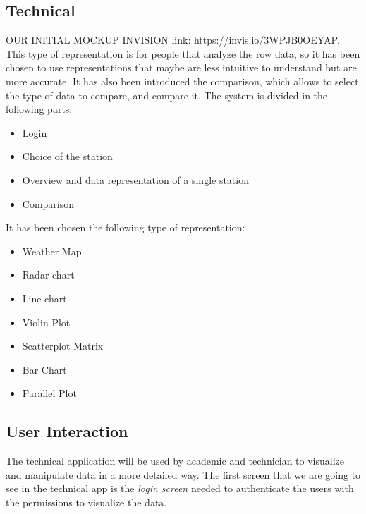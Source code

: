 \documentclass[12pt]{article} %
\begin{document}
\subsection{Technical}
OUR INITIAL MOCKUP INVISION link: https://invis.io/3WPJB0OEYAP.
This type of representation is for people that analyze the row data, so it has been chosen to use representations that maybe are less intuitive to understand but are more accurate. 
 It has also been introduced the comparison, which allows to select the type of data to compare, and compare it.
The system is divided in the following parts: 
\begin{itemize}
\item Login
\item Choice of the station
\item Overview and data representation of a single station  
\item Comparison
\end{itemize}
It has been chosen the following type of representation: 
\begin{itemize}
\item Weather Map
\item Radar chart
\item Line chart
\item Violin Plot
\item Scatterplot Matrix
\item Bar Chart
\item Parallel Plot
\end{itemize}
\subsection{User Interaction}
The technical application will be used by academic and technician to visualize and manipulate data in a more detailed way. The first screen that we are going to see in the technical app is the \textit{login screen} needed to authenticate the users with the permissions to visualize the data.
\end{document}
